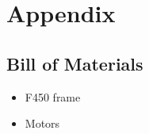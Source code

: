 

\section{Appendix}

\subsection{Bill of Materials}

\begin{itemize}
	\item F450 frame
	\item Motors
\end{itemize}

\newpage

%



